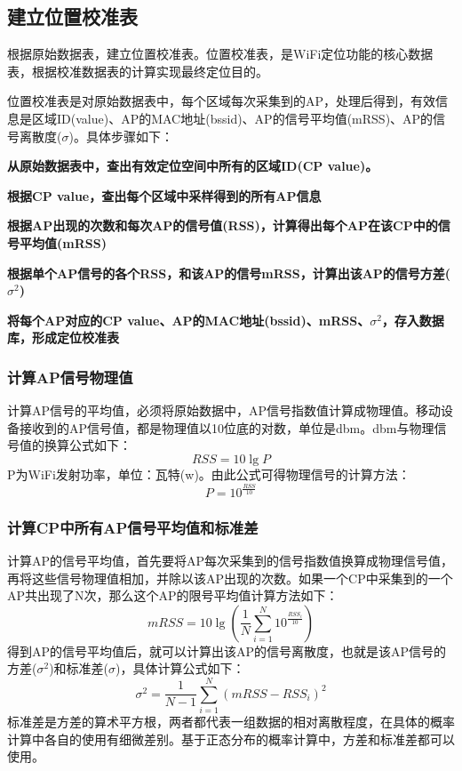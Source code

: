 \documentclass[UTF8, twocolumn ]{ctexart}
\begin{document}
\subsection{建立位置校准表}
根据原始数据表，建立位置校准表。位置校准表，是WiFi定位功能的核心数据表，根据校准数据表的计算实现最终定位目的。
\par
位置校准表是对原始数据表中，每个区域每次采集到的AP，处理后得到，有效信息是区域ID(value)、AP的MAC地址(bssid)、AP的信号平均值(mRSS)、AP的信号离散度($\sigma$)。具体步骤如下：
\begin{compactitem}
\item\textbf{从原始数据表中，查出有效定位空间中所有的区域ID(CP value)。}
\item\textbf{根据CP value，查出每个区域中采样得到的所有AP信息}
\item\textbf{根据AP出现的次数和每次AP的信号值(RSS)，计算得出每个AP在该CP中的信号平均值(mRSS)}
\item\textbf{根据单个AP信号的各个RSS，和该AP的信号mRSS，计算出该AP的信号方差($\sigma^{2}$)}
\item\textbf{将每个AP对应的CP value、AP的MAC地址(bssid)、mRSS、$\sigma^{2}$，存入数据库，形成定位校准表}
\end{compactitem}

\subsubsection{计算AP信号物理值}
计算AP信号的平均值，必须将原始数据中，AP信号指数值计算成物理值。移动设备接收到的AP信号值，都是物理值以10位底的对数，单位是dbm。dbm与物理信号值的换算公式如下：
\begin{equation}
  RSS=10\lg{P}
\end{equation}
P为WiFi发射功率，单位：瓦特(w)。由此公式可得物理信号的计算方法：
\begin{equation}
  P=10^{\frac{RSS}{10}}
\end{equation}

\subsubsection{计算CP中所有AP信号平均值和标准差}
计算AP的信号平均值，首先要将AP每次采集到的信号指数值换算成物理信号值，再将这些信号物理值相加，并除以该AP出现的次数。如果一个CP中采集到的一个AP共出现了N次，那么这个AP的限号平均值计算方法如下：
\begin{equation}
  mRSS=10\lg\left(\frac{1}{N}\sum^{N}_{i=1}10^{\frac{RSS_{i}}{10}}\right)
\end{equation}
得到AP的信号平均值后，就可以计算出该AP的信号离散度，也就是该AP信号的方差($\sigma^{2}$)和标准差($\sigma$)，具体计算公式如下：
\begin{equation}
  \sigma^{2}=\frac{1}{N-1}\sum^{N}_{i=1}\left(mRSS-RSS_{i}\right)^{2}
\end{equation}
标准差是方差的算术平方根，两者都代表一组数据的相对离散程度，在具体的概率计算中各自的使用有细微差别。基于正态分布的概率计算中，方差和标准差都可以使用。
\end{document}
